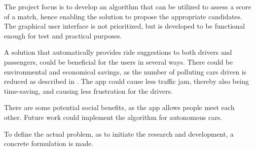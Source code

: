 The project focus is to develop an algorithm that can be utilized to assess a score of a match, hence enabling the solution to propose the appropriate candidates. The graphical user interface is not prioritized, but is developed to be functional enough for test and practical purposes.

A solution that automatically provides ride suggestions to both drivers and passengers, could be beneficial for the users in several ways. There could be environmental and economical savings, as the number of polluting cars driven is reduced as described in \cite{doi:10.1080/01441647.2011.621557}. The app could cause less traffic jam, thereby also being time-saving, and causing less frustration for the drivers.

There are some potential social benefits, as the app allows people meet each other. Future work could implement the algorithm for autonomous cars.

\iffalse
Since employers usually are located in the same area, and commuters could live in the same area, there should be a possibility for the commuters  potentially share cars and thereby reduce traffic.
There are many apps\todo{source and define 'app'} that allow users to request and give rides\todo{define}, but they require active participation of the users to do so. 
\fi

To define the actual problem, as to initiate the research and development, a concrete formulation is made.